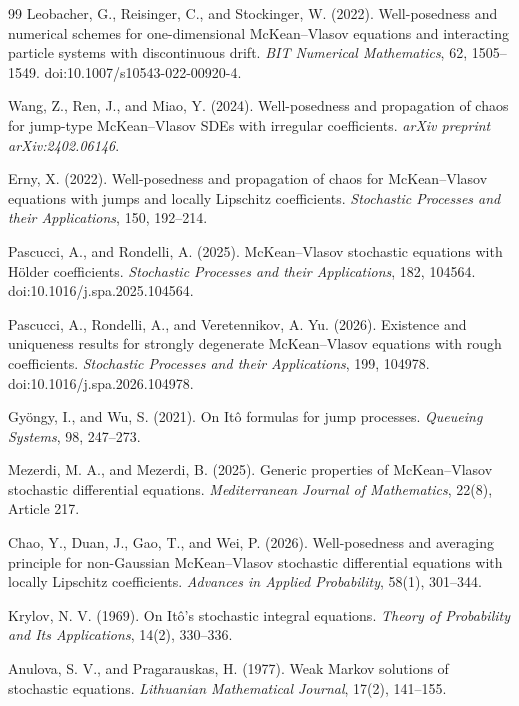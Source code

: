 \documentclass[12pt,oneside, reqno]{amsart}
\numberwithin{equation}{section}
\begin{document}
\begin{thebibliography}{99}
		Leobacher, G., Reisinger, C., and Stockinger, W. (2022). Well-posedness
		and numerical schemes for one-dimensional McKean--Vlasov equations and
		interacting particle systems with discontinuous drift.
		{\it BIT Numerical Mathematics}, 62, 1505--1549.
		doi:10.1007/s10543-022-00920-4.
		
		Wang, Z., Ren, J., and Miao, Y. (2024). Well-posedness and propagation of
		chaos for jump-type McKean--Vlasov SDEs with irregular coefficients.
		{\it arXiv preprint arXiv:2402.06146}.
		
		Erny, X. (2022). Well-posedness and propagation of chaos for McKean--Vlasov equations with jumps and locally Lipschitz coefficients. {\it Stochastic Processes and their Applications}, 150, 192--214.
		
		
		Pascucci, A., and Rondelli, A. (2025). McKean--Vlasov stochastic equations with H\"older coefficients. {\it Stochastic Processes and their Applications}, 182, 104564. doi:10.1016/j.spa.2025.104564.
		
		Pascucci, A., Rondelli, A., and Veretennikov, A. Yu. (2026). Existence and uniqueness results for strongly degenerate McKean--Vlasov equations with rough coefficients. {\it Stochastic Processes and their Applications}, 199, 104978. doi:10.1016/j.spa.2026.104978.
		
		Gy\"ongy, I., and Wu, S. (2021). On It\^o formulas for jump processes. {\it Queueing Systems}, 98, 247--273.
		
		Mezerdi, M. A., and Mezerdi, B. (2025). Generic properties of McKean--Vlasov stochastic differential equations. {\it Mediterranean Journal of Mathematics}, 22(8), Article 217.
		
		Chao, Y., Duan, J., Gao, T., and Wei, P. (2026). Well-posedness and averaging principle for non-Gaussian McKean--Vlasov stochastic differential equations with locally Lipschitz coefficients. {\it Advances in Applied Probability}, 58(1), 301--344.
		
		Krylov, N. V. (1969). On It\^o's stochastic integral equations.
		{\it Theory of Probability and Its Applications}, 14(2), 330--336.
		
		Anulova, S. V., and Pragarauskas, H. (1977). Weak Markov solutions of
		stochastic equations. {\it Lithuanian Mathematical Journal}, 17(2),
		141--155.
		

\end{thebibliography}
\end{document}
